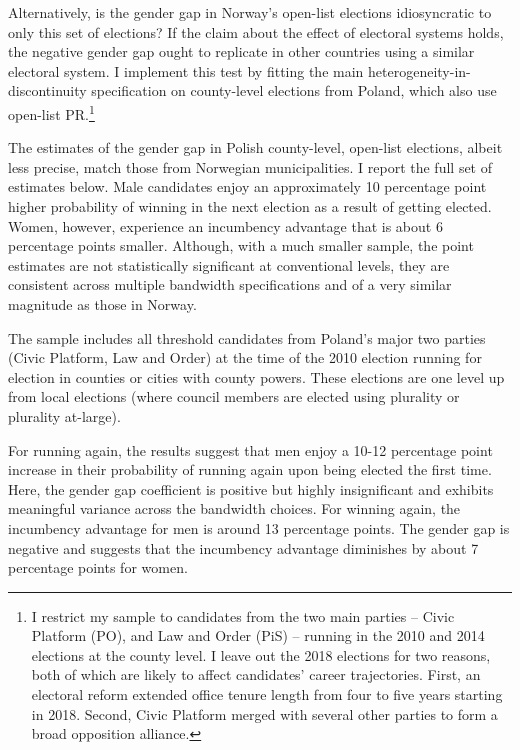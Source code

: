 \documentclass[12pt]{article}
\begin{document}
Alternatively, is the gender gap in Norway's open-list elections idiosyncratic to only this set of elections? If the claim about the effect of electoral systems holds, the negative gender gap ought to replicate in other countries using a similar electoral system. I implement this test by fitting the main heterogeneity-in-discontinuity specification on county-level elections from Poland, which also use open-list PR.\footnote{I restrict my sample to candidates from the two main parties -- Civic Platform (PO), and Law and Order (PiS) -- running in the 2010 and 2014 elections at the county level. I leave out the 2018 elections for two reasons, both of which are likely to affect candidates' career trajectories. First, an electoral reform extended office tenure length from four to five years starting in 2018. Second, Civic Platform merged with several other parties to form a broad opposition alliance.}

The estimates of the gender gap in Polish county-level, open-list elections, albeit less precise, match those from Norwegian municipalities. I report the full set of estimates below. Male candidates enjoy an approximately 10 percentage point higher probability of winning in the next election as a result of getting elected. Women, however, experience an incumbency advantage that is about 6 percentage points smaller. Although, with a much smaller sample, the point estimates are not statistically significant at conventional levels, they are consistent across multiple bandwidth specifications and of a very similar magnitude as those in Norway.

The sample includes all threshold candidates from Poland's major two parties (Civic Platform, Law and Order) at the time of the 2010 election running for election in counties or cities with county powers. These elections are one level up from local elections (where council members are elected using plurality or plurality at-large).

For running again, the results suggest that men enjoy a 10-12 percentage point increase in their probability of running again upon being elected the first time. Here, the gender gap coefficient is positive but highly insignificant and exhibits meaningful variance across the bandwidth choices. For winning again, the incumbency advantage for men is around 13 percentage points. The gender gap is negative and suggests that the incumbency advantage diminishes by about 7 percentage points for women.


\end{document}
